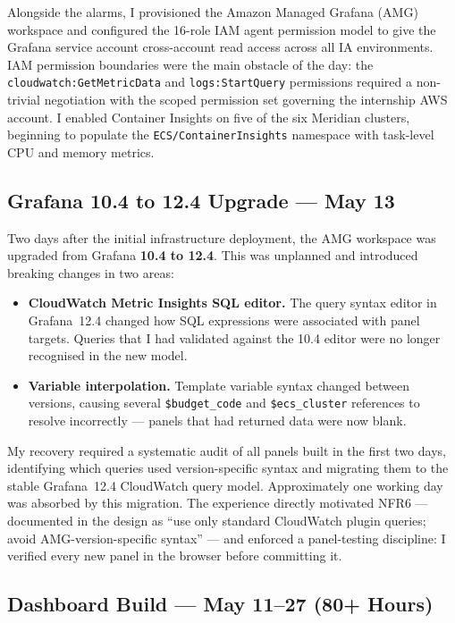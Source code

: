 Alongside the alarms, I provisioned the Amazon Managed Grafana (AMG) workspace
and configured the 16-role IAM agent permission model to give the Grafana
service account cross-account read access across all IA environments. IAM
permission boundaries were the main obstacle of the day: the
\texttt{cloudwatch:GetMetricData} and \texttt{logs:StartQuery} permissions
required a non-trivial negotiation with the scoped permission set governing
the internship AWS account. I enabled Container Insights on five of the six
Meridian clusters, beginning to populate the \texttt{ECS/ContainerInsights}
namespace with task-level CPU and memory metrics.

\subsection{Grafana 10.4 to 12.4 Upgrade --- May 13}

Two days after the initial infrastructure deployment, the AMG workspace was
upgraded from Grafana \textbf{10.4 to 12.4}. This was unplanned and introduced
breaking changes in two areas:

\begin{itemize}
    \item \textbf{CloudWatch Metric Insights SQL editor.} The query syntax
          editor in Grafana~12.4 changed how SQL expressions were associated
          with panel targets. Queries that I had validated against the 10.4
          editor were no longer recognised in the new model.
    \item \textbf{Variable interpolation.} Template variable syntax changed
          between versions, causing several \texttt{\$budget\_code} and
          \texttt{\$ecs\_cluster} references to resolve incorrectly --- panels
          that had returned data were now blank.
\end{itemize}

My recovery required a systematic audit of all panels built in the first two days,
identifying which queries used version-specific syntax and migrating them to the
stable Grafana~12.4 CloudWatch query model. Approximately one working day was
absorbed by this migration. The experience directly motivated NFR6 --- documented
in the design as ``use only standard CloudWatch plugin queries; avoid
AMG-version-specific syntax'' --- and enforced a panel-testing discipline:
I verified every new panel in the browser before committing it.

\subsection{Dashboard Build --- May 11--27 (80+ Hours)}

